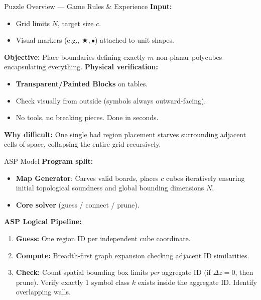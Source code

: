 \documentclass[aspectratio=169]{beamer}
\begin{document}
\begin{frame}{Puzzle Overview --- Game Rules \& Experience}
    \textbf{Input:}
    \begin{itemize}
        \item Grid limits $N$, target size $c$.
        \item Visual markers (e.g., $\bigstar, \bullet$) attached to unit shapes.
    \end{itemize}
    \vspace{0.3cm}
    \textbf{Objective:}
    Place boundaries defining exactly $m$ non-planar polycubes encapsulating everything.
    \vspace{0.3cm}
    \textbf{Physical verification:}
    \begin{itemize}
        \item \textbf{Transparent/Painted Blocks} on tables.
        \item Check visually from outside (symbols always outward-facing).
        \item No tools, no breaking pieces. Done in seconds.
    \end{itemize}
    \vspace{0.3cm}
    \textbf{Why difficult:} One single bad region placement starves surrounding adjacent cells of space, collapsing the entire grid recursively.
\end{frame}

\begin{frame}{ASP Model}
    \textbf{Program split:}
    \begin{itemize}
        \item \textbf{Map Generator}: Carves valid boards, places $c$ cubes iteratively ensuring initial topological soundness and global bounding dimensions $N$.
        \item \textbf{Core solver} (guess / connect / prune).
    \end{itemize}
    \vspace{0.3cm}
    \textbf{ASP Logical Pipeline:}
    \begin{enumerate}
        \item \textbf{Guess:} One region ID per independent cube coordinate.
        \item \textbf{Compute:} Breadth-first graph expansion checking adjacent ID similarities.
        \item \textbf{Check:} Count spatial bounding box limits \textit{per} aggregate ID (if $\Delta z=0$, then prune). Verify exactly $1$ symbol class $k$ exists inside the aggregate ID. Identify overlapping walls.
    \end{enumerate}
\end{frame}
\end{document}
